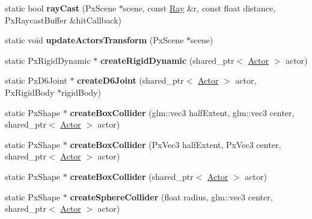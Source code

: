 \begin{DoxyCompactItemize}
\item 
\hypertarget{class_physics_a6989c20a392877d24738ec1b05e9e22b}{}static bool {\bfseries ray\+Cast} (Px\+Scene $\ast$scene, const \hyperlink{class_ray}{Ray} \&r, const float distance, Px\+Raycast\+Buffer \&hit\+Callback)\label{class_physics_a6989c20a392877d24738ec1b05e9e22b}

\item 
\hypertarget{class_physics_a13d6c1dfe0b3441343bb0d30a498c5ce}{}static void {\bfseries update\+Actors\+Transform} (Px\+Scene $\ast$scene)\label{class_physics_a13d6c1dfe0b3441343bb0d30a498c5ce}

\item 
\hypertarget{class_physics_ae59d1a2bd0dc9bc2ad54074a1a6b43ec}{}static Px\+Rigid\+Dynamic $\ast$ {\bfseries create\+Rigid\+Dynamic} (shared\+\_\+ptr$<$ \hyperlink{class_actor}{Actor} $>$ actor)\label{class_physics_ae59d1a2bd0dc9bc2ad54074a1a6b43ec}

\item 
\hypertarget{class_physics_aa7faba18fc0143b4ddaae52eca219716}{}static Px\+D6\+Joint $\ast$ {\bfseries create\+D6\+Joint} (shared\+\_\+ptr$<$ \hyperlink{class_actor}{Actor} $>$ actor, Px\+Rigid\+Body $\ast$rigid\+Body)\label{class_physics_aa7faba18fc0143b4ddaae52eca219716}

\item 
\hypertarget{class_physics_a763587f080bb42879a8fa10d009e44fe}{}static Px\+Shape $\ast$ {\bfseries create\+Box\+Collider} (glm\+::vec3 half\+Extent, glm\+::vec3 center, shared\+\_\+ptr$<$ \hyperlink{class_actor}{Actor} $>$ actor)\label{class_physics_a763587f080bb42879a8fa10d009e44fe}

\item 
\hypertarget{class_physics_ae6015ef65348a1c01a85d2e079d35eac}{}static Px\+Shape $\ast$ {\bfseries create\+Box\+Collider} (Px\+Vec3 half\+Extent, Px\+Vec3 center, shared\+\_\+ptr$<$ \hyperlink{class_actor}{Actor} $>$ actor)\label{class_physics_ae6015ef65348a1c01a85d2e079d35eac}

\item 
\hypertarget{class_physics_a2ef2359f0d22c30244dcbb98e707e52b}{}static Px\+Shape $\ast$ {\bfseries create\+Box\+Collider} (shared\+\_\+ptr$<$ \hyperlink{class_actor}{Actor} $>$ actor)\label{class_physics_a2ef2359f0d22c30244dcbb98e707e52b}

\item 
\hypertarget{class_physics_a5a259da34b27da97a4fc5ae046b844db}{}static Px\+Shape $\ast$ {\bfseries create\+Sphere\+Collider} (float radius, glm\+::vec3 center, shared\+\_\+ptr$<$ \hyperlink{class_actor}{Actor} $>$ actor)\label{class_physics_a5a259da34b27da97a4fc5ae046b844db}


\end{DoxyCompactItemize}
